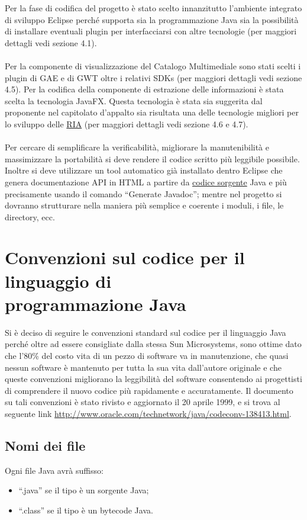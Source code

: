 Per la fase di codifica del progetto \`e stato scelto innanzitutto l'ambiente
integrato di sviluppo Eclipse perch\'e supporta sia la programmazione Java
sia la possibilit\`a  di installare eventuali plugin per interfacciarsi con
altre tecnologie (per maggiori dettagli vedi sezione 4.1).\\ \\
Per la componente di visualizzazione del Catalogo
Multimediale sono stati scelti i plugin di GAE e di GWT oltre i relativi SDKs
(per maggiori dettagli vedi sezione 4.5). 
Per la codifica della componente di estrazione delle informazioni \`e stata
scelta la tecnologia JavaFX. Questa tecnologia \`e stata sia suggerita dal
proponente nel capitolato d'appalto sia risultata una delle tecnologie migliori
per lo sviluppo delle \underline{RIA} (per maggiori dettagli vedi sezione 4.6 e
4.7). \\ \\
Per cercare di semplificare la verificabilit\`a, migliorare la
manutenibilit\`a e massimizzare la portabilit\`a si deve rendere il codice
scritto pi\`u leggibile possibile.
Inoltre si deve utilizzare un tool automatico gi\`a
installato dentro Eclipse che genera documentazione API in HTML a partire da
\underline{codice sorgente} Java e pi\`u precisamente usando il comando
``Generate Javadoc''; mentre nel progetto si dovranno strutturare nella maniera pi\`u semplice e coerente i moduli, i
file, le directory, ecc.\\
 
\section{Convenzioni sul codice per il linguaggio di \\programmazione Java}
Si \`e deciso di seguire le convenzioni standard sul codice per il linguaggio
Java perch\'e oltre ad essere consigliate dalla stessa Sun Microsystems, sono
ottime dato che l'80\% del costo vita di un pezzo di software va in
manutenzione, che quasi nessun software \`e mantenuto per tutta la sua vita
dall'autore originale e che queste convenzioni migliorano la leggibilit\`a
del software consentendo ai progettisti di comprendere il nuovo codice pi\`u
rapidamente e accuratamente.
Il documento su tali convenzioni \`e stato rivisto e aggiornato il 20 aprile
1999, e si trova al seguente link
\url{http://www.oracle.com/technetwork/java/codeconv-138413.html}.

\subsection{Nomi dei file}
Ogni file Java avr\`a suffisso:
\begin{itemize}
  \item ``.java'' se il tipo \`e un sorgente Java;
  \item ``.class'' se il tipo \`e un bytecode Java.
\end{itemize}

